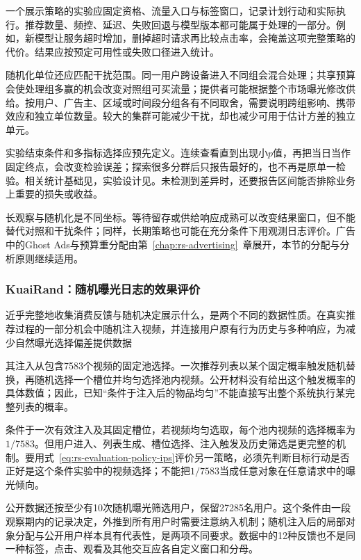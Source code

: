 一个展示策略的实验应固定资格、流量入口与标签窗口，记录计划行动和实际执行。推荐数量、频控、延迟、失败回退与模型版本都可能属于处理的一部分。例如，新模型让服务超时增加，删掉超时请求再比较点击率，会掩盖这项完整策略的代价。结果应按预定可用性或失败口径进入统计。

随机化单位还应匹配干扰范围。同一用户跨设备进入不同组会混合处理；共享预算会使处理组多赢的机会改变对照组可买流量；提供者可能根据整个市场曝光修改供给。按用户、广告主、区域或时间段分组各有不同取舍，需要说明跨组影响、携带效应和独立单位数量。较大的集群可能减少干扰，却也减少可用于估计方差的独立单元。

实验结束条件和多指标选择应预先定义。连续查看直到出现小$p$值，再把当日当作固定终点，会改变检验误差；探索很多分群后只报告最好的，也不再是原单一检验。相关统计基础见，实验设计见。未检测到差异时，还要报告区间能否排除业务上重要的损失或收益。

长观察与随机化是不同坐标。等待留存或供给响应成熟可以改变结果窗口，但不能替代对照和干扰条件；同样，长期策略也可能在充分条件下用观测日志评价。广告中的Ghost Ads与预算重分配由第~\ref{chap:rs-advertising}~章展开，本节的分配与分析原则继续适用。

\Needspace{105mm}
\subsubsection{KuaiRand：随机曝光日志的效果评价}
\label{sec:rs-evaluation-kuairand}

近乎完整地收集消费反馈与随机决定展示什么，是两个不同的数据性质。在真实推荐过程的一部分机会中随机注入视频，并连接用户原有行为历史与多种响应，为减少自然曝光选择偏差提供数据

其注入从包含7583个视频的固定池选择。一次推荐列表以某个固定概率触发随机替换，再随机选择一个槽位并均匀选择池内视频。公开材料没有给出这个触发概率的具体数值；因此，已知“条件于注入后的物品均匀”不能直接写出整个系统执行某完整列表的概率。

条件于一次有效注入及其固定槽位，若视频均匀选取，每个池内视频的选择概率为$1/7583$。但用户进入、列表生成、槽位选择、注入触发及历史筛选是更完整的机制。要用式~\eqref{eq:rs-evaluation-policy-ips}评价另一策略，必须先判断目标行动是否正好是这个条件实验中的视频选择；不能把$1/7583$当成任意对象在任意请求中的曝光倾向。

公开数据还按至少有10次随机曝光筛选用户，保留27285名用户。这个条件由一段观察期内的记录决定，外推到所有用户时需要注意纳入机制；随机注入后的局部对象分配与公开用户样本具有代表性，是两项不同要求。数据中的12种反馈也不是同一种标签，点击、观看及其他交互应各自定义窗口和分母。

